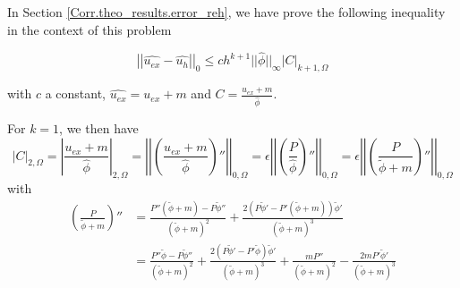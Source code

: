 In Section \ref{Corr.theo_results.error_reh}, we have prove the following inequality in the context of this problem

\begin{equation*}
	\left|\left|\hat{u_{ex}}-\hat{u_h}\right|\right|_0\le ch^{k+1}||\hat{\phi}||_\infty\left|C\right|_{k+1,\Omega}
\end{equation*}

\newpage

with $c$ a constant, $\hat{u_{ex}}=u_{ex}+m$ and $C=\frac{u_{ex}+m}{\hat{\phi}}$.

For $k=1$, we then have
\begin{equation*}
	|C|_{2,\Omega}=\left|\frac{u_{ex}+m}{\hat{\phi}}\right|_{2,\Omega}=\left|\left|\left(\frac{u_{ex}+m}{\hat{\phi}}\right)''\right|\right|_{0,\Omega}=\epsilon\left|\left|\left(\frac{P}{\hat{\phi}}\right)''\right|\right|_{0,\Omega}=\epsilon\left|\left|\left(\frac{P}{\tilde{\phi}+m}\right)''\right|\right|_{0,\Omega}
\end{equation*}
with
\begin{align*}
	\left(\frac{P}{\tilde{\phi}+m}\right)''&=\frac{P''(\tilde{\phi}+m)-P\tilde{\phi}''}{(\tilde{\phi}+m)^2}+\frac{2(P\tilde{\phi}'-P'(\tilde{\phi}+m))\tilde{\phi}'}{(\tilde{\phi}+m)^3} \\
	&=\frac{P''\tilde{\phi}-P\tilde{\phi}''}{(\tilde{\phi}+m)^2}+\frac{2(P\tilde{\phi}'-P'\tilde{\phi})\tilde{\phi}'}{(\tilde{\phi}+m)^3}+    \frac{mP''}{(\tilde{\phi}+m)^2}-\frac{2mP'\tilde{\phi}'}{(\tilde{\phi}+m)^3}
\end{align*}

